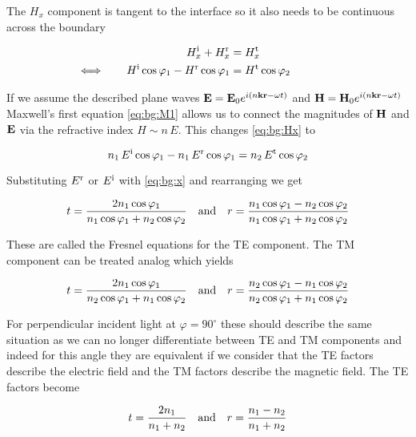 The $H_x$ component is tangent to the interface so it also needs to be continuous across the boundary

\begin{equation}\label{eq:bg:Hx}
\begin{aligned}
     H^{\mathrm{i}}_x +  H^{\mathrm{r}}_x &=  H^{\mathrm{t}}_x \\
    \Longleftrightarrow \qquad
    H^{\mathrm{i}} \cos \varphi_1 - H^{\mathrm{r}} \cos \varphi_1 &= H^{\mathrm{t}} \cos \varphi_2
    \qquad  \qquad
\end{aligned}
\end{equation}

If we assume the described plane waves 
$\vb E = \vb E_0 e^{i(n \vb k \vb r - \omega t)}$
and 
$\vb H = \vb H_0 e^{i(n \vb k \vb r - \omega t)}$
Maxwell's first equation \eqref{eq:bg:M1} allows us to connect the magnitudes of $\vb H$ and $\vb E$ via the refractive index $H \sim n \, E$. This changes \eqref{eq:bg:Hx} to

\begin{equation}
    n_1 \, E^{\mathrm{i}} \cos \varphi_1 - n_1 \, E^{\mathrm{r}} \cos \varphi_1 =
    n_2 \, E^{\mathrm{t}} \cos \varphi_2
\end{equation}

Substituting $E^{\mathrm{r}}$ or $E^{\mathrm{i}}$ with \eqref{eq:bg:x} and rearranging we get

\begin{equation}
    t = \frac{2 n_1 \cos \varphi_1}{n_1 \cos \varphi_1 + n_2 \cos \varphi_2}
    \qq{and}
    r = \frac{n_1 \cos \varphi_1 - n_2 \cos \varphi_2}{
    n_1 \cos \varphi_1 + n_2 \cos \varphi_2}
\end{equation}

These are called the Fresnel equations for the TE component. The TM component can be treated analog which yields

\begin{equation}
    t = \frac{2 n_1 \cos \varphi_1}{n_2 \cos \varphi_1 + n_1 \cos \varphi_2}
    \qq{and}
    r = \frac{n_2 \cos \varphi_1 - n_1 \cos \varphi_2}{
    n_2 \cos \varphi_1 + n_1 \cos \varphi_2}
\end{equation}

For perpendicular incident light at $\varphi = 90^\circ$ these should describe the same situation as we can no longer differentiate between TE and TM components and indeed for this angle they are equivalent if we consider that the TE factors describe the electric field and the TM factors describe the magnetic field. The TE factors become

\begin{equation}
    t = \frac{2 n_1}{n_1 + n_2} \qq{and} r = \frac{n_1 - n_2}{n_1 + n_2}
\end{equation}

